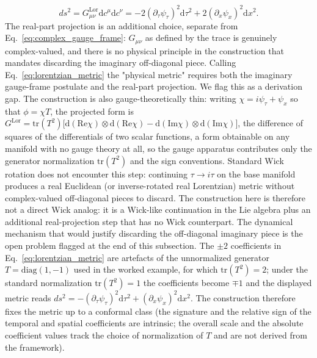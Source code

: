 \documentclass[11pt]{article}
\begin{document}
\begin{equation}
\boxed{ds^2 = G^{\mathrm{Lor}}_{\mu\nu} \mathrm{d}c^\mu \mathrm{d}c^\nu = -2(\partial_\tau \psi_\tau)^2 \mathrm{d}\tau^2 + 2(\partial_x \psi_x)^2 \mathrm{d}x^2.}
\label{eq:lorentzian_metric}
\end{equation}
The real-part projection is an additional choice, separate from Eq.~\eqref{eq:complex_gauge_frame}: $G_{\mu\nu}$ as defined by the trace is genuinely complex-valued, and there is no physical principle in the construction that mandates discarding the imaginary off-diagonal piece. Calling Eq.~\eqref{eq:lorentzian_metric} the "physical metric" requires both the imaginary gauge-frame postulate and the real-part projection. We flag this as a derivation gap. The construction is also gauge-theoretically thin: writing $\chi = i\psi_\tau + \psi_x$ so that $\phi = \chi T$, the projected form is $G^{\mathrm{Lor}} = \mathrm{tr}(T^2)\big[\mathrm{d}(\mathrm{Re}\chi)\otimes\mathrm{d}(\mathrm{Re}\chi) - \mathrm{d}(\mathrm{Im}\chi)\otimes\mathrm{d}(\mathrm{Im}\chi)\big]$, the difference of squares of the differentials of two scalar functions, a form obtainable on any manifold with no gauge theory at all, so the gauge apparatus contributes only the generator normalization $\mathrm{tr}(T^2)$ and the sign conventions. Standard Wick rotation does not encounter this step: continuing $\tau \to i\tau$ on the base manifold produces a real Euclidean (or inverse-rotated real Lorentzian) metric without complex-valued off-diagonal pieces to discard. The construction here is therefore not a direct Wick analog: it is a Wick-like continuation in the Lie algebra plus an additional real-projection step that has no Wick counterpart. The dynamical mechanism that would justify discarding the off-diagonal imaginary piece is the open problem flagged at the end of this subsection. The $\pm 2$ coefficients in Eq.~\eqref{eq:lorentzian_metric} are artefacts of the unnormalized generator $T = \mathrm{diag}(1, -1)$ used in the worked example, for which $\mathrm{tr}(T^2) = 2$; under the standard normalization $\mathrm{tr}(T^2) = 1$ the coefficients become $\mp 1$ and the displayed metric reads $ds^2 = -(\partial_\tau \psi_\tau)^2 \mathrm{d}\tau^2 + (\partial_x \psi_x)^2 \mathrm{d}x^2$. The construction therefore fixes the metric up to a conformal class (the signature and the relative sign of the temporal and spatial coefficients are intrinsic; the overall scale and the absolute coefficient values track the choice of normalization of $T$ and are not derived from the framework).
\end{document}
